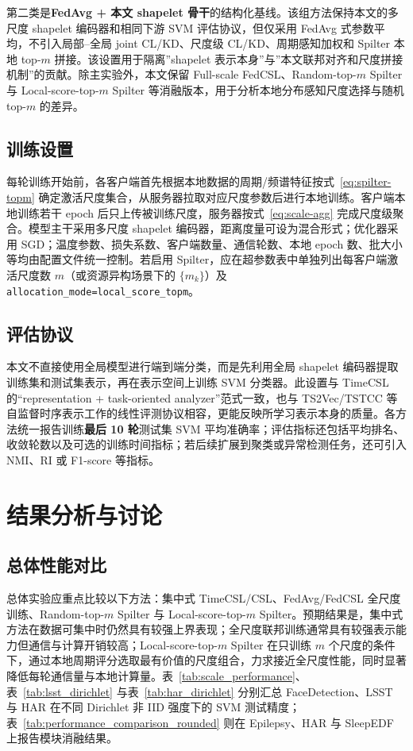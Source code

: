 \documentclass{article}
\begin{document}
第二类是\textbf{FedAvg + 本文 shapelet 骨干}的结构化基线。该组方法保持本文的多尺度 shapelet 编码器和相同下游 SVM 评估协议，但仅采用 FedAvg 式参数平均，不引入局部--全局 joint CL/KD、尺度级 CL/KD、周期感知加权和 Spilter 本地 top-$m$ 拼接。该设置用于隔离”shapelet 表示本身”与”本文联邦对齐和尺度拼接机制”的贡献。除主实验外，本文保留 Full-scale FedCSL、Random-top-$m$ Spilter 与 Local-score-top-$m$ Spilter 等消融版本，用于分析本地分布感知尺度选择与随机 top-$m$ 的差异。

\subsection{训练设置}

每轮训练开始前，各客户端首先根据本地数据的周期/频谱特征按式~\eqref{eq:spilter-topm} 确定激活尺度集合，从服务器拉取对应尺度参数后进行本地训练。客户端本地训练若干 epoch 后只上传被训练尺度，服务器按式~\eqref{eq:scale-agg} 完成尺度级聚合。模型主干采用多尺度 shapelet 编码器，距离度量可设为混合形式；优化器采用 SGD；温度参数、损失系数、客户端数量、通信轮数、本地 epoch 数、批大小等均由配置文件统一控制。若启用 Spilter，应在超参数表中单独列出每客户端激活尺度数 $m$（或资源异构场景下的 $\{m_k\}$）及 \texttt{allocation\_mode=local\_score\_topm}。

\subsection{评估协议}

本文不直接使用全局模型进行端到端分类，而是先利用全局 shapelet 编码器提取训练集和测试集表示，再在表示空间上训练 SVM 分类器。此设置与 TimeCSL 的“representation + task-oriented analyzer”范式一致\cite{timescsl}，也与 TS2Vec/TSTCC 等自监督时序表示工作的线性评测协议相容\cite{ts2vec,tstcc}，更能反映所学习表示本身的质量。各方法统一报告训练\textbf{最后 10 轮}测试集 SVM 平均准确率；评估指标还包括平均排名、收敛轮数以及可选的训练时间指标；若后续扩展到聚类或异常检测任务，还可引入 NMI、RI 或 F1-score 等指标。

\section{结果分析与讨论}

\subsection{总体性能对比}

总体实验应重点比较以下方法：集中式 TimeCSL/CSL、FedAvg/FedCSL 全尺度训练、Random-top-$m$ Spilter 与 Local-score-top-$m$ Spilter。预期结果是，集中式方法在数据可集中时仍然具有较强上界表现；全尺度联邦训练通常具有较强表示能力但通信与计算开销较高；Local-score-top-$m$ Spilter 在只训练 $m$ 个尺度的条件下，通过本地周期评分选取最有价值的尺度组合，力求接近全尺度性能，同时显著降低每轮通信量与本地计算量。表~\ref{tab:scale_performance}、表~\ref{tab:lsst_dirichlet} 与表~\ref{tab:har_dirichlet} 分别汇总 FaceDetection、LSST 与 HAR 在不同 Dirichlet 非 IID 强度下的 SVM 测试精度；表~\ref{tab:performance_comparison_rounded} 则在 Epilepsy、HAR 与 SleepEDF 上报告模块消融结果。
\end{document}
